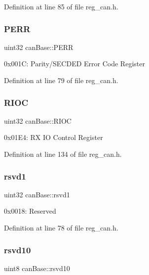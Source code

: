 Definition at line 85 of file reg\+\_\+can.\+h.

\mbox{\label{structcanBase_aec0f3c119af71db3e1bd519fa03eb99b}} 
\subsubsection{\texorpdfstring{P\+E\+RR}{PERR}}
{\footnotesize\ttfamily uint32 can\+Base\+::\+P\+E\+RR}

0x001C\+: Parity/\+S\+E\+C\+D\+ED Error Code Register 

Definition at line 79 of file reg\+\_\+can.\+h.

\mbox{\label{structcanBase_acf21910844548f2cd05545153d124dc0}} 
\subsubsection{\texorpdfstring{R\+I\+OC}{RIOC}}
{\footnotesize\ttfamily uint32 can\+Base\+::\+R\+I\+OC}

0x01\+E4\+: RX IO Control Register 

Definition at line 134 of file reg\+\_\+can.\+h.

\mbox{\label{structcanBase_ad88961784c847134b59e86e7ebdb7085}} 
\subsubsection{\texorpdfstring{rsvd1}{rsvd1}}
{\footnotesize\ttfamily uint32 can\+Base\+::rsvd1}

0x0018\+: Reserved 

Definition at line 78 of file reg\+\_\+can.\+h.

\mbox{\label{structcanBase_ae4b66bbf5d42e4ae66b5c89ce0285308}} 
\subsubsection{\texorpdfstring{rsvd10}{rsvd10}}
{\footnotesize\ttfamily uint8 can\+Base\+::rsvd10}

